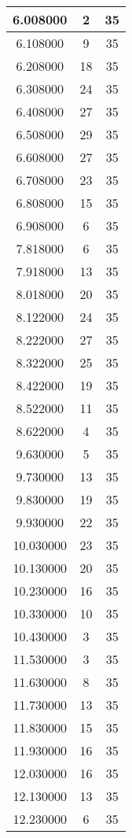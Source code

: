\begin{longtable}[htbp]{|c|c|c|}
6.008000 & 2 & 35 \\ \hline
6.108000 & 9 & 35 \\ \hline
6.208000 & 18 & 35 \\ \hline
6.308000 & 24 & 35 \\ \hline
6.408000 & 27 & 35 \\ \hline
6.508000 & 29 & 35 \\ \hline
6.608000 & 27 & 35 \\ \hline
6.708000 & 23 & 35 \\ \hline
6.808000 & 15 & 35 \\ \hline
6.908000 & 6 & 35 \\ \hline
7.818000 & 6 & 35 \\ \hline
7.918000 & 13 & 35 \\ \hline
8.018000 & 20 & 35 \\ \hline
8.122000 & 24 & 35 \\ \hline
8.222000 & 27 & 35 \\ \hline
8.322000 & 25 & 35 \\ \hline
8.422000 & 19 & 35 \\ \hline
8.522000 & 11 & 35 \\ \hline
8.622000 & 4 & 35 \\ \hline
9.630000 & 5 & 35 \\ \hline
9.730000 & 13 & 35 \\ \hline
9.830000 & 19 & 35 \\ \hline
9.930000 & 22 & 35 \\ \hline
10.030000 & 23 & 35 \\ \hline
10.130000 & 20 & 35 \\ \hline
10.230000 & 16 & 35 \\ \hline
10.330000 & 10 & 35 \\ \hline
10.430000 & 3 & 35 \\ \hline
11.530000 & 3 & 35 \\ \hline
11.630000 & 8 & 35 \\ \hline
11.730000 & 13 & 35 \\ \hline
11.830000 & 15 & 35 \\ \hline
11.930000 & 16 & 35 \\ \hline
12.030000 & 16 & 35 \\ \hline
12.130000 & 13 & 35 \\ \hline
12.230000 & 6 & 35 \\ \hline
\end{longtable}
